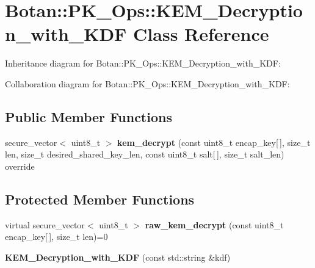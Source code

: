 \hypertarget{class_botan_1_1_p_k___ops_1_1_k_e_m___decryption__with___k_d_f}{}\section{Botan\+:\+:P\+K\+\_\+\+Ops\+:\+:K\+E\+M\+\_\+\+Decryption\+\_\+with\+\_\+\+K\+DF Class Reference}
\label{class_botan_1_1_p_k___ops_1_1_k_e_m___decryption__with___k_d_f}


Inheritance diagram for Botan\+:\+:P\+K\+\_\+\+Ops\+:\+:K\+E\+M\+\_\+\+Decryption\+\_\+with\+\_\+\+K\+DF\+:


Collaboration diagram for Botan\+:\+:P\+K\+\_\+\+Ops\+:\+:K\+E\+M\+\_\+\+Decryption\+\_\+with\+\_\+\+K\+DF\+:
\subsection*{Public Member Functions}
\begin{DoxyCompactItemize}
\item 
\mbox{\label{class_botan_1_1_p_k___ops_1_1_k_e_m___decryption__with___k_d_f_aabdd6c6af260a39feeff2eb62bfc243a}} 
secure\+\_\+vector$<$ uint8\+\_\+t $>$ {\bfseries kem\+\_\+decrypt} (const uint8\+\_\+t encap\+\_\+key\mbox{[}$\,$\mbox{]}, size\+\_\+t len, size\+\_\+t desired\+\_\+shared\+\_\+key\+\_\+len, const uint8\+\_\+t salt\mbox{[}$\,$\mbox{]}, size\+\_\+t salt\+\_\+len) override
\end{DoxyCompactItemize}
\subsection*{Protected Member Functions}
\begin{DoxyCompactItemize}
\item 
\mbox{\label{class_botan_1_1_p_k___ops_1_1_k_e_m___decryption__with___k_d_f_a595712e663a4f53bba19b78f1ff6e304}} 
virtual secure\+\_\+vector$<$ uint8\+\_\+t $>$ {\bfseries raw\+\_\+kem\+\_\+decrypt} (const uint8\+\_\+t encap\+\_\+key\mbox{[}$\,$\mbox{]}, size\+\_\+t len)=0
\item 
\mbox{\label{class_botan_1_1_p_k___ops_1_1_k_e_m___decryption__with___k_d_f_a81a0e5b22badcf0a9e8e96d9504b11ef}} 
{\bfseries K\+E\+M\+\_\+\+Decryption\+\_\+with\+\_\+\+K\+DF} (const std\+::string \&kdf)
\end{DoxyCompactItemize}


